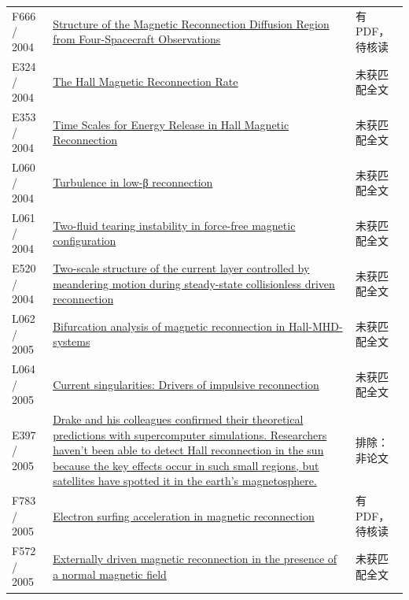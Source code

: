 \documentclass[UTF8,a4paper,11pt,openany,fontset=fandol]{ctexbook}
\begin{document}
\begin{longtable}{P{24mm}P{97mm}P{27mm}}
F666 / 2004 & \href{https://doi.org/10.1103/physrevlett.93.105001}{Structure of the Magnetic Reconnection Diffusion Region from Four-Spacecraft Observations} & 有PDF，待核读\\

E324 / 2004 & \href{http://ui.adsabs.harvard.edu/abs/2004APS..DPPBP1080H/abstract}{The Hall Magnetic Reconnection Rate} & 未获匹配全文\\

E353 / 2004 & \href{https://ui.adsabs.harvard.edu/abs/2004AGUSMSM43A..04H/abstract}{Time Scales for Energy Release in Hall Magnetic Reconnection} & 未获匹配全文\\

L060 / 2004 & \href{https://doi.org/10.1063/1.1776565}{Turbulence in low-β reconnection} & 未获匹配全文\\

L061 / 2004 & \href{https://doi.org/10.1063/1.1773778}{Two-fluid tearing instability in force-free magnetic configuration} & 未获匹配全文\\

E520 / 2004 & \href{https://doi.org/10.1063/1.1758718}{Two-scale structure of the current layer controlled by meandering motion during steady-state collisionless driven reconnection} & 未获匹配全文\\

L062 / 2005 & \href{https://doi.org/10.1016/j.physd.2005.06.003}{Bifurcation analysis of magnetic reconnection in Hall-MHD-systems} & 未获匹配全文\\

L064 / 2005 & \href{https://doi.org/10.1063/1.1872893}{Current singularities: Drivers of impulsive reconnection} & 未获匹配全文\\

E397 / 2005 & \href{https://terpconnect.umd.edu/~drake/news/TriggeringSolarMayhem.pdf}{Drake and his colleagues confirmed their theoretical predictions with supercomputer simulations. Researchers haven't been able to detect Hall reconnection in the sun because the key effects occur in such small regions,  but satellites have spotted it in the earth's magnetosphere.} & 排除：非论文\\

F783 / 2005 & \href{https://doi.org/10.1029/2005ja011229}{Electron surfing acceleration in magnetic reconnection} & 有PDF，待核读\\

F572 / 2005 & \href{https://doi.org/10.1029/2004ja010948}{Externally driven magnetic reconnection in the presence of a normal magnetic field} & 未获匹配全文\\


\end{longtable}
\end{document}
